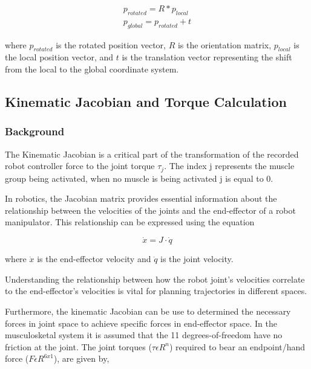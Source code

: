 \begin{equation}
\begin{aligned}
    p_{rotated} = R*p_{local} \\
    p_{global} = p_{rotated} + t
\end{aligned}
\end{equation}

where $p_{rotated}$ is the rotated position vector, $R$ is the orientation matrix, $p_{local}$ is the local position vector, and $t$ is the translation vector representing the shift from the local to the global coordinate system.


\newpage
\subsection{Kinematic Jacobian and Torque Calculation}

\subsubsection{Background} 

The Kinematic Jacobian is a critical part of the transformation of the recorded robot controller force to the joint torque $\tau_j$. The index j represents the muscle group being activated, when no muscle is being activated j is equal to 0.

In robotics, the Jacobian matrix provides essential information about the relationship between the velocities of the joints and the end-effector of a robot manipulator. This relationship can be expressed using the equation

\begin{equation}
\dot{x} = J \cdot \dot{q}
\end{equation}

where $\dot{x}$ is the end-effector velocity and $\dot{q}$ is the joint velocity.

Understanding the relationship between how the robot joint's velocities correlate to the end-effector's velocities is vital for planning trajectories in different spaces.

Furthermore, the kinematic Jacobian can be use to determined the necessary forces in joint space to achieve specific forces in end-effector space. In the musculosketal system it is assumed that the 11 degrees-of-freedom have no friction at the joint. The joint torques ($ \tau \epsilon R^n$) required to bear an endpoint/hand force ($F \epsilon R^{6x1}$), are given by,

